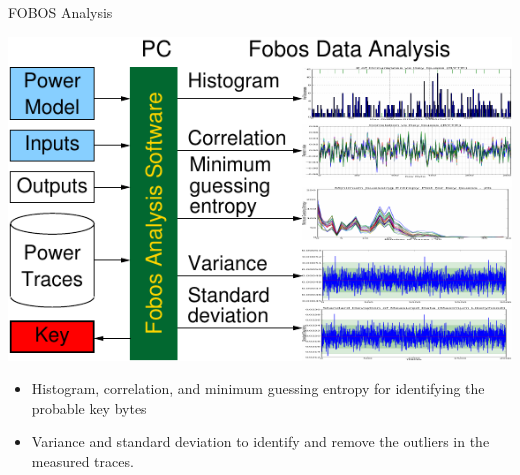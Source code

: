 \documentclass[final]{beamer}
\begin{document}
\begin{frame}[fragile]{}
\begin{columns}[t]
\begin{column}{.31\linewidth}
       \begin{block}{FOBOS Analysis}
        \begin{minipage}{0.69\linewidth}
		\includegraphics[scale=1.5]{../figures/fobos-dan}
        \end{minipage}
	\hspace{-5ex}
	\begin{minipage}{0.31\linewidth}
		\begin{itemize}
		 \item Histogram, correlation, and minimum guessing entropy for 
		       identifying the probable key bytes
		 \item Variance and standard deviation to identify and remove the outliers 
		       in the measured traces. 
		\end{itemize}

	\end{minipage}


\end{block}
\end{column}
\end{columns}
\end{frame}
\end{document}
